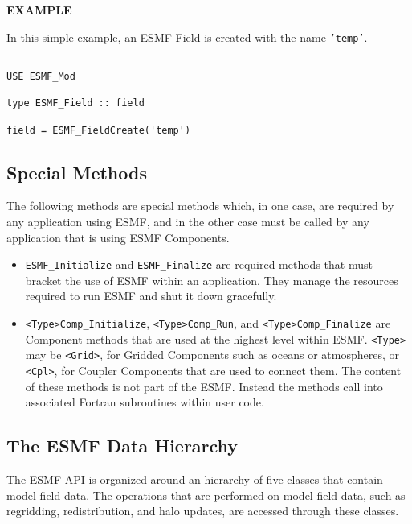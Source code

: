 {\bf EXAMPLE}

In this simple example, an ESMF Field is created with the 
name {\tt 'temp'}.  

\begin{verbatim}

USE ESMF_Mod

type ESMF_Field :: field

field = ESMF_FieldCreate('temp')

\end{verbatim}

\subsection{Special Methods}

The following methods are special methods which, in one case,
are required by any application using ESMF, and in the 
other case must be called by any application that is using 
ESMF Components.

\begin{itemize}

\item {\tt ESMF\_Initialize} and {\tt ESMF\_Finalize} are required 
methods that must bracket the use of ESMF within an application.  
They manage the resources required to run ESMF and shut it down
gracefully.

\item {\tt <Type>Comp\_Initialize}, {\tt <Type>Comp\_Run}, and 
{\tt <Type>Comp\_Finalize} are Component methods that are used at the 
highest level within ESMF.  {\tt <Type>} may be {\tt <Grid>}, for 
Gridded Components such as oceans or atmospheres, or
{\tt <Cpl>}, for Coupler Components that are used to connect 
them.  The content of these methods is not part of the ESMF.  
Instead the methods call into associated Fortran subroutines within 
user code.

\end{itemize}

\subsection{The ESMF Data Hierarchy}

The ESMF API is organized around an hierarchy of five classes that 
contain model field data.  The operations that are performed
on model field data, such as regridding, redistribution, and halo 
updates, are accessed through these classes.  

